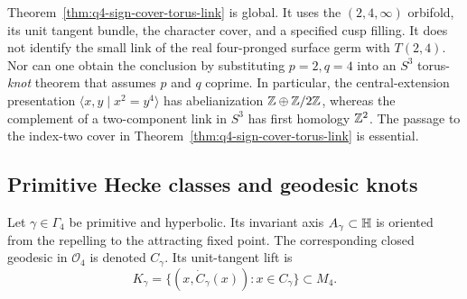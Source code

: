 \begin{warning}
\label{warn:q4-local-global-link}
Theorem~\ref{thm:q4-sign-cover-torus-link} is global.  It uses the
\((2,4,\infty)\) orbifold, its unit tangent bundle, the character cover, and a
specified cusp filling.  It does not identify the small link of the real
four-pronged surface germ with \(T(2,4)\).  Nor can one obtain the conclusion by
substituting \(p=2,q=4\) into an \(S^3\) torus-\emph{knot} theorem that assumes
\(p\) and \(q\) coprime.  In particular, the central-extension presentation
\(\langle x,y\mid x^2=y^4\rangle\) has abelianization
\(\mathbb{Z}\oplus\mathbb{Z}/2\mathbb{Z}\), whereas the complement of a two-component link in \(S^3\)
has first homology \(\mathbb{Z}^2\).  The passage to the index-two cover in
Theorem~\ref{thm:q4-sign-cover-torus-link} is essential.
\end{warning}

\subsection{Primitive Hecke classes and geodesic knots}

\begin{definition}
Let \(\gamma\in\Gamma_4\) be primitive and hyperbolic.  Its invariant axis
\(A_\gamma\subset\mathbb{H}\) is oriented from the repelling to the attracting fixed
point.  The corresponding closed geodesic in \(\mathcal O_4\) is denoted
\(C_\gamma\).  Its unit-tangent lift is
\begin{equation}
 K_\gamma
 =\{(x,\dot C_\gamma(x)):x\in C_\gamma\}
 \subset M_4.
 \label{eq:q4-unit-tangent-knot}
\end{equation}
\end{definition}

